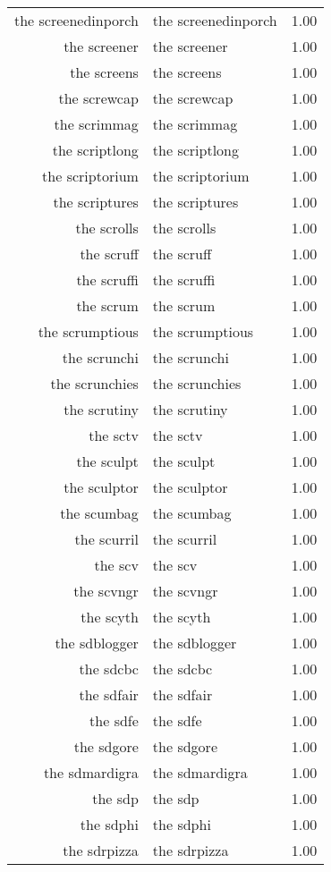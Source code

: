 \begin{table}[ht]
\begin{tabular}{rlr}
  the screenedinporch & the screenedinporch & 1.00 \\ 
  the screener & the screener & 1.00 \\ 
  the screens & the screens & 1.00 \\ 
  the screwcap & the screwcap & 1.00 \\ 
  the scrimmag & the scrimmag & 1.00 \\ 
  the scriptlong & the scriptlong & 1.00 \\ 
  the scriptorium & the scriptorium & 1.00 \\ 
  the scriptures & the scriptures & 1.00 \\ 
  the scrolls & the scrolls & 1.00 \\ 
  the scruff & the scruff & 1.00 \\ 
  the scruffi & the scruffi & 1.00 \\ 
  the scrum & the scrum & 1.00 \\ 
  the scrumptious & the scrumptious & 1.00 \\ 
  the scrunchi & the scrunchi & 1.00 \\ 
  the scrunchies & the scrunchies & 1.00 \\ 
  the scrutiny & the scrutiny & 1.00 \\ 
  the sctv & the sctv & 1.00 \\ 
  the sculpt & the sculpt & 1.00 \\ 
  the sculptor & the sculptor & 1.00 \\ 
  the scumbag & the scumbag & 1.00 \\ 
  the scurril & the scurril & 1.00 \\ 
  the scv & the scv & 1.00 \\ 
  the scvngr & the scvngr & 1.00 \\ 
  the scyth & the scyth & 1.00 \\ 
  the sdblogger & the sdblogger & 1.00 \\ 
  the sdcbc & the sdcbc & 1.00 \\ 
  the sdfair & the sdfair & 1.00 \\ 
  the sdfe & the sdfe & 1.00 \\ 
  the sdgore & the sdgore & 1.00 \\ 
  the sdmardigra & the sdmardigra & 1.00 \\ 
  the sdp & the sdp & 1.00 \\ 
  the sdphi & the sdphi & 1.00 \\ 
  the sdrpizza & the sdrpizza & 1.00 \\ 

\end{tabular}
\end{table}
